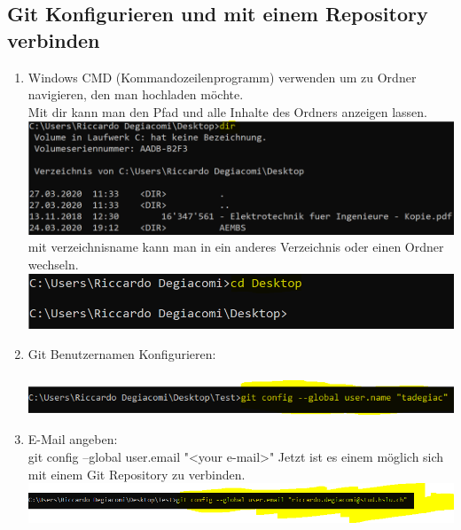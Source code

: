 \documentclass[a4paper, 8pt]{extarticle}
\begin{document}
\begin{multicols*}{3}
        \section{Git Konfigurieren und mit einem Repository verbinden}
                \begin{enumerate}
                    \item   Windows CMD (Kommandozeilenprogramm) verwenden um zu Ordner navigieren, 
                            den man hochladen möchte.\\
                            Mit dir kann man den Pfad und alle Inhalte des Ordners anzeigen lassen. 
                                \includegraphics[width=1\linewidth, left]{img/cmd_befehle_dir}
                            mit  verzeichnisname kann man in ein anderes Verzeichnis oder einen Ordner wechseln. 
                                \includegraphics[width=1\linewidth, left]{img/cmd_befehle_cd}
                    \item   Git Benutzernamen Konfigurieren:\\
                             \\
                                \includegraphics[width=1\linewidth, left]{img/git_config_username.PNG}
                    \item   E-Mail angeben:\\
                            git config --global user.email "<your e-mail>"
                            Jetzt ist es einem möglich sich mit einem Git Repository zu verbinden.
                                \includegraphics[width=1\linewidth, left]{img/git_config_email.PNG}

\end{enumerate}
\end{multicols*}
\end{document}
